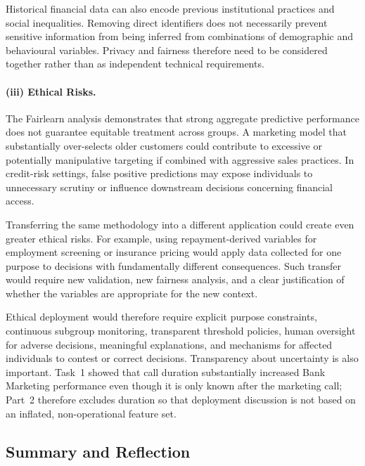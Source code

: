 Historical financial data can also encode previous institutional practices and social
inequalities. Removing direct identifiers does not necessarily prevent sensitive
information from being inferred from combinations of demographic and behavioural
variables. Privacy and fairness therefore need to be considered together rather than
as independent technical requirements.

\paragraph{(iii) Ethical Risks.}
The Fairlearn analysis demonstrates that strong aggregate predictive performance does
not guarantee equitable treatment across groups. A marketing model that substantially
over-selects older customers could contribute to excessive or potentially
manipulative targeting if combined with aggressive sales practices. In credit-risk
settings, false positive predictions may expose individuals to unnecessary scrutiny
or influence downstream decisions concerning financial access.

Transferring the same methodology into a different application could create even
greater ethical risks. For example, using repayment-derived variables for employment
screening or insurance pricing would apply data collected for one purpose to decisions
with fundamentally different consequences. Such transfer would require new validation,
new fairness analysis, and a clear justification of whether the variables are
appropriate for the new context.

Ethical deployment would therefore require explicit purpose constraints, continuous
subgroup monitoring, transparent threshold policies, human oversight for adverse
decisions, meaningful explanations, and mechanisms for affected individuals to contest
or correct decisions. Transparency about uncertainty is also important. Task~1 showed
that call duration substantially increased Bank Marketing performance even though it
is only known after the marketing call; Part~2 therefore excludes duration so that
deployment discussion is not based on an inflated, non-operational feature set.


\subsection{Summary and Reflection}
\label{sec:part2-summary}

